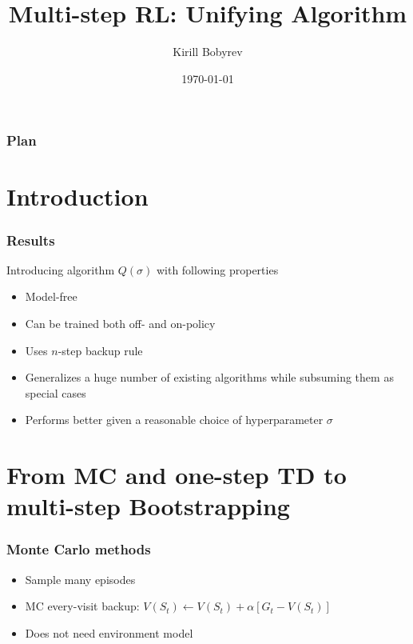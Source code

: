 \documentclass{beamer}
\title{Multi-step RL: Unifying Algorithm}
\author{Kirill Bobyrev}
\date{\today}
\begin{document}
\begin{frame}
  \titlepage
\end{frame}

\begin{frame}
  \frametitle{Plan}
  \tableofcontents
\end{frame}


\section{Introduction}

\begin{frame}
  \frametitle{Results}
  Introducing algorithm $Q(\sigma)$ with following properties
  \begin{itemize}
    \item Model-free
    \item Can be trained both off- and on-policy
    \item Uses $n$-step backup rule
    \item Generalizes a huge number of existing algorithms while subsuming them
      as special cases
    \item Performs better given a reasonable choice of hyperparameter $\sigma$
  \end{itemize}
\end{frame}

\section{From MC and one-step TD to multi-step Bootstrapping}

\begin{frame}
  \frametitle{Monte Carlo methods}
  \begin{itemize}
    \item Sample many episodes
    \item MC every-visit backup: $V(S_t) \leftarrow V(S_t) +
      \alpha[G_t - V(S_t)]$
    \item Does not need environment model
  \end{itemize}
\end{frame}
\end{document}

